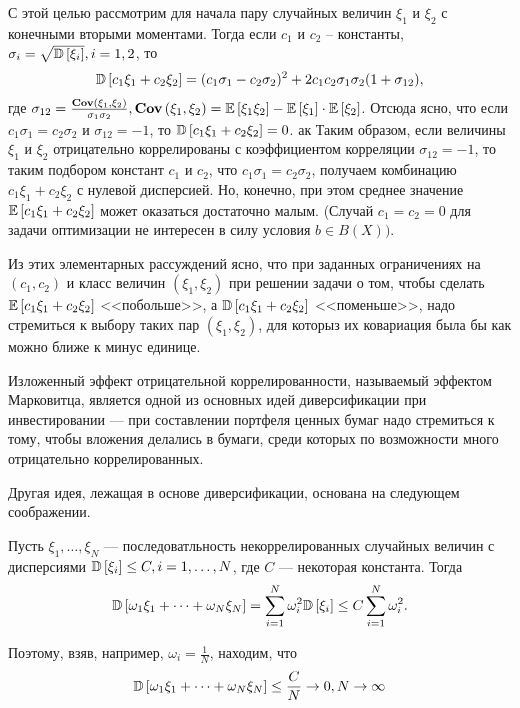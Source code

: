 С этой целью рассмотрим для начала пару случайных величин $\xi_1$ и $\xi_2$ с конечными вторыми моментами. Тогда если $c_1$ и $c_2$ -- константы,
$\sigma_i = \sqrt{\mathbb{D}\left[\xi_i\right]}, i=1,2$, то 
\begin{align}
\mathbb{D}\left[c_1 \xi_1 + c_2 \xi_2\right] = 
	(c_1 \sigma_1 - c_2 \sigma_2)^2 + 2 c_1 c_2 \sigma_1 \sigma_2 (1 + \sigma_{12}),
\end{align}
где $\sigma_{12} = \frac{\textbf{Cov}\left(\xi_1, \xi_2\right)}{\sigma_1 \sigma_2}, \textbf{Cov}\left(\xi_1, \xi_2\right) = \mathbb{E}\left[\xi_1 \xi_2\right] - \mathbb{E}\left[\xi_1\right] \cdot \mathbb{E}\left[\xi_2\right]$.
Отсюда ясно, что если $c_1 \sigma_1 = c_2 \sigma_2$ и $\sigma_{12} = -1$, то $\mathbb{D}\left[c_1 \xi_1 + c_2 \xi_2\right] = 0$.
ак
Таким образом, если величины $\xi_1$ и $\xi_2$ отрицательно коррелированы с коэффициентом корреляции $\sigma_{12} = -1$, то таким подбором
констант $c_1$ и $c_2$, что $c_1 \sigma_1 = c_2 \sigma_2$, получаем комбинацию $c_1 \xi_1 + c_2 \xi_2$ с нулевой дисперсией. Но,
конечно, при этом среднее значение $\mathbb{E}\left[c_1 \xi_1 + c_2 \xi_2\right]$ может оказаться достаточно малым. (Случай $c_1 = c_2 = 0$ для задачи 
оптимизации не интересен в силу условия $b \in B(X))$.

Из этих элементарных рассуждений ясно, что при заданных ограничениях на $(c_1, c_2)$ и класс величин $(\xi_1, \xi_2)$ при решении задачи о том,
чтобы сделать $\mathbb{E}\left[c_1 \xi_1 + c_2 \xi_2\right]$ <<побольше>>, а $\mathbb{D}\left[c_1 \xi_1 + c_2 \xi_2\right]$ <<поменьше>>, надо стремиться к выбору таких пар 
$(\xi_1, \xi_2)$, для которыз их ковариация была бы как можно ближе к минус единице.

Изложенный эффект отрицательной коррелированности, называемый эффектом Марковитца, является одной из основных идей диверсификации при инвестировании ---
при составлении портфеля ценных бумаг надо стремиться к тому, чтобы вложения делались в бумаги, среди которых по возможности много отрицательно коррелированных.

Другая идея, лежащая в основе диверсификации, основана на следующем соображении.

Пусть $\xi_1, \dots, \xi_N$ --- последоватльность некоррелированных случайных величин с дисперсиями $\mathbb{D}\left[\xi_i\right] \le C, i=1, \dots, N$, 
где $C$ --- некоторая константа. Тогда
\begin{align}
\mathbb{D}\left[\omega_1 \xi_1 + \dots + \omega_N \xi_N\right] = \sum_{i=1}^{N} \omega_i^2 \mathbb{D}\left[\xi_i\right] \le C \sum_{i=1}^{N} \omega_i^2 .
\end{align}

Поэтому, взяв, например, $\omega_i = \frac{1}{N}$, находим, что
\begin{align}
\mathbb{D}\left[\omega_1 \xi_1 + \dots + \omega_N \xi_N\right] \le \frac{C}{N} \rightarrow 0, N \rightarrow \infty
\end{align}

